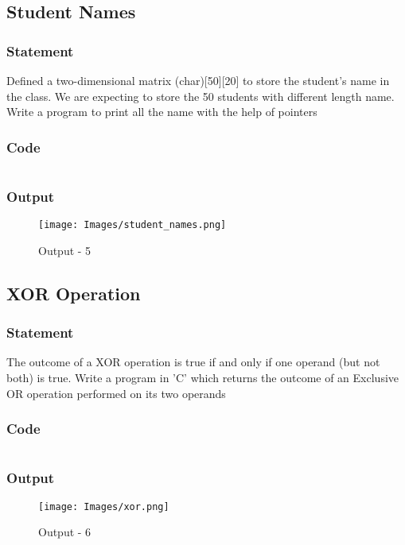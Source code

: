 \pagebreak
\subsection{Student Names}

\subsubsection{Statement}
Defined a two-dimensional matrix (char)[50][20] to store the student’s name in the class.
We are expecting to store the 50 students with different length name. Write a program to print all
the name with the help of pointers

\subsubsection{Code}
\inputminted[]{c}{./code/students.cpp}
\pagebreak
\subsubsection{Output}
\begin{figure}[!htb]
  \centering
  \texttt{[image: Images/student\_names.png]}
  \label{Output-5}
  \caption{Output - 5}
\end{figure}

\pagebreak
\subsection{XOR Operation}

\subsubsection{Statement}
The outcome of a XOR operation is true if and only if one operand (but not both) is true. Write
a program in 'C' which returns the outcome of an Exclusive OR operation performed on its two
operands

\subsubsection{Code}
\inputminted[]{c}{./code/xor.cpp}
\subsubsection{Output}
\begin{figure}[!htb]
  \centering
  \texttt{[image: Images/xor.png]}
  \label{Output-6}
  \caption{Output - 6}
\end{figure}


